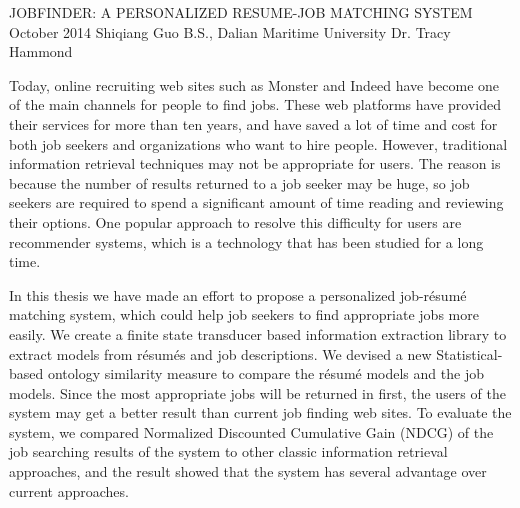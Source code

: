 \begingroup
\absone
{JOBFINDER: A PERSONALIZED RESUME-JOB MATCHING SYSTEM}
{October 2014}
{Shiqiang Guo}
{B.S., Dalian Maritime University}  %
{Dr. Tracy Hammond}%
{
Today, online recruiting web sites such as Monster and Indeed have become one of the main channels for people to find jobs. These web platforms have provided their services for more than ten years, and have saved a lot of time and cost for both job seekers and organizations who want to hire people. However, traditional information retrieval techniques may not be appropriate for users. The reason is because the number of results returned to a job seeker may be huge, so job seekers are required to spend a significant amount of time reading and reviewing their options. One popular approach to resolve this difficulty for users are recommender systems, which is a technology that has been studied for a long time.

In this thesis we have made an effort to propose a personalized job-r\'esum\'e matching system, which could help job seekers to find appropriate jobs more easily.  We create a finite state transducer based information extraction library to extract models from r\'esum\'es and job descriptions. We devised a new Statistical-based ontology similarity measure to compare the r\'esum\'e models and the job models. Since the most appropriate jobs will be returned in first, the users of the system may get a better result than current job finding web sites. To evaluate the system, we compared Normalized Discounted Cumulative Gain (NDCG) of the job searching results of the system to other classic information retrieval approaches, and the result showed that the system has several advantage over current approaches.}
\endgroup



